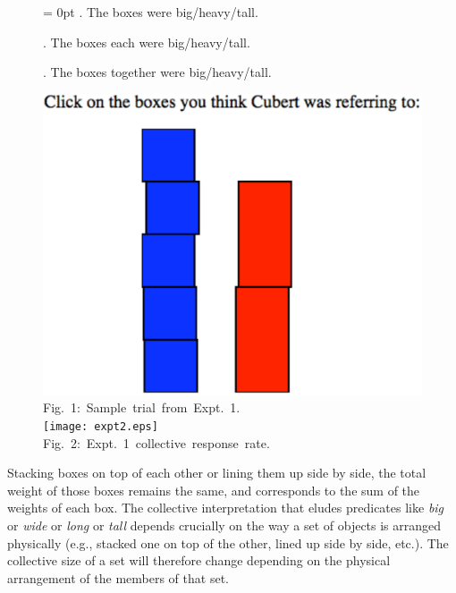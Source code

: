 \documentclass[11pt]{article}
\begin{document}
            \begin{figure}  
            	\vspace{-15pt}    
            	\Exlabelsep = 0pt
            	\ex. \label{bare} The boxes were big/heavy/tall.
            	
            	\ex. \label{each} The boxes {each} were big/heavy/tall.
            	
            	\ex. \label{tog} The boxes {together} were big/heavy/tall.
            	
            	\centering
            	\vspace{-2pt}
            	\includegraphics[width=.95\linewidth]{trial2.eps}\\
            	\vspace{-3pt}
            	\mbox{Fig.~1: Sample trial from Expt.~1.}\\
            	\mbox{\hspace{-11pt}\texttt{[image: expt2.eps]}}\\
            	\vspace{-8pt}
            	\mbox{Fig.~2: Expt.~1 collective response rate.}
            \end{figure}
             Stacking boxes on top of each other or lining them up side by side, the total weight of those boxes remains the same, and corresponds to the sum of the weights of each box. The collective interpretation that eludes predicates like \textit{big} or \textit{wide} or \textit{long} or \textit{tall} depends crucially on the way a set of objects is arranged physically (e.g., stacked one on top of the other, lined up side by side, etc.). The collective size of a set will therefore change depending on the physical arrangement of the members of that set. 
\end{document}
